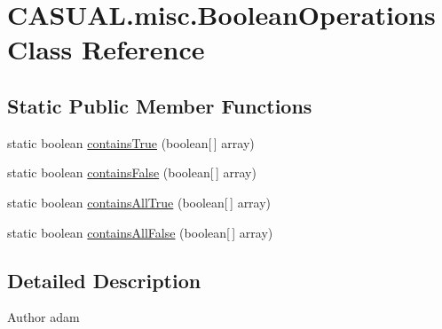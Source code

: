 \hypertarget{classCASUAL_1_1misc_1_1BooleanOperations}{\section{C\-A\-S\-U\-A\-L.\-misc.\-Boolean\-Operations Class Reference}
\label{classCASUAL_1_1misc_1_1BooleanOperations}
}
\subsection*{Static Public Member Functions}
\begin{DoxyCompactItemize}
\item 
static boolean \hyperlink{classCASUAL_1_1misc_1_1BooleanOperations_abbaa982b83fe042c5bc99732b6a3895b}{contains\-True} (boolean\mbox{[}$\,$\mbox{]} array)
\item 
static boolean \hyperlink{classCASUAL_1_1misc_1_1BooleanOperations_a3430431c1adfe2e54f6f79ad80727278}{contains\-False} (boolean\mbox{[}$\,$\mbox{]} array)
\item 
static boolean \hyperlink{classCASUAL_1_1misc_1_1BooleanOperations_a9d9505748bc5ea948e2bbe2575dc76ec}{contains\-All\-True} (boolean\mbox{[}$\,$\mbox{]} array)
\item 
static boolean \hyperlink{classCASUAL_1_1misc_1_1BooleanOperations_a0e8040e7c409325c27d97d85a26967e5}{contains\-All\-False} (boolean\mbox{[}$\,$\mbox{]} array)
\end{DoxyCompactItemize}


\subsection{Detailed Description}
\begin{DoxyAuthor}{Author}
adam 
\end{DoxyAuthor}


